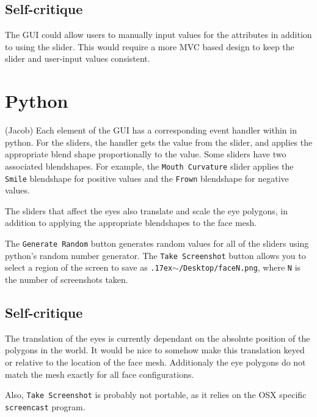 \documentclass{article}
\begin{document}
  \subsection*{Self-critique}
  The GUI could allow users to manually input values for the attributes in addition to using the slider. This would require a more MVC based design to keep the slider and user-input values consistent.

\section*{Python} (Jacob)
Each element of the GUI
has a corresponding event 
handler within in python. For the sliders, the handler gets the value from the slider, and applies the appropriate blend shape proportionally to the value. Some sliders have two
associated blendshapes. For example, the \texttt{Mouth Curvature} slider applies the \texttt{Smile} blendshape for positive values and the \texttt{Frown} blendshape for negative values.

The sliders that affect the eyes also translate and scale the eye polygons, in addition to applying the appropriate blendshapes to the face mesh.

The \texttt{Generate Random} button generates random values for all of the sliders using python's random number generator. The 
\texttt{Take Screenshot} button allows you to select a region of the screen to save as \texttt{{\raise.17ex\hbox{$\scriptstyle\sim$}}/Desktop/faceN.png}, where \texttt{N} is the number of screenshots taken.

  \subsection*{Self-critique} The translation of the eyes is currently dependant on the absolute position of the polygons in the world. It would be nice to somehow make this translation keyed or relative to the location of the face mesh. Additionaly the eye polygons do not match the mesh exactly for all
  face configurations.
  
  Also, \texttt{Take Screenshot} is probably not portable, as it relies on the OSX specific \texttt{screencast} program.
\end{document}
